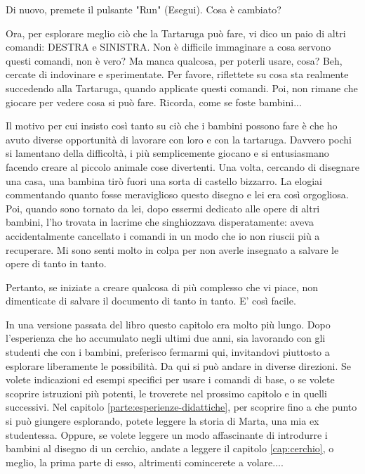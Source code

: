 \vskip 1cm

Di nuovo, premete il pulsante "Run" (Esegui). Cosa è cambiato? 

Ora, per esplorare meglio ciò che la Tartaruga può fare, vi dico un paio di altri comandi: DESTRA e SINISTRA. Non è difficile immaginare a cosa servono questi comandi, non è vero? Ma manca qualcosa, per poterli usare, cosa? Beh, cercate di indovinare e sperimentate. Per favore, riflettete su cosa sta realmente succedendo alla Tartaruga, quando applicate questi comandi. Poi, non rimane che giocare per vedere cosa si può fare. Ricorda, come se foste bambini...

Il motivo per cui insisto così tanto su ciò che i bambini possono fare è che ho avuto diverse opportunità di lavorare con loro e con la tartaruga. Davvero pochi si lamentano della difficoltà, i più semplicemente giocano e si entusiasmano facendo creare al piccolo animale cose divertenti.  Una volta, cercando di disegnare una casa, una bambina tirò fuori una sorta di castello bizzarro. La elogiai commentando quanto fosse meraviglioso questo disegno e lei era così orgogliosa. Poi, quando sono tornato da lei, dopo essermi dedicato alle opere di altri bambini, l'ho trovata in lacrime che singhiozzava disperatamente: aveva accidentalmente cancellato i comandi in un modo che io non riuscii più a recuperare. Mi sono senti molto in colpa per non averle insegnato a salvare le opere di tanto in tanto.

Pertanto, se iniziate a creare qualcosa di più complesso che vi piace, non dimenticate di salvare il documento di tanto in tanto. E' così facile.

In una versione passata del libro questo capitolo era molto più lungo. Dopo l'esperienza che ho accumulato negli ultimi due anni, sia lavorando con gli studenti che con i bambini, preferisco fermarmi qui, invitandovi piuttosto a esplorare liberamente le possibilità. Da qui si può andare in diverse direzioni. Se volete indicazioni ed esempi specifici per usare i comandi di base, o se volete scoprire istruzioni più potenti, le troverete nel prossimo capitolo e in quelli successivi.  Nel capitolo \ref{parte:esperienze-didattiche}, per scoprire fino a che punto si può giungere esplorando, potete leggere la storia di Marta, una mia ex studentessa. Oppure, se volete leggere un modo affascinante di introdurre i bambini al disegno di un cerchio, andate a leggere il capitolo \ref{cap:cerchio}, o meglio, la prima parte di esso, altrimenti comincerete a volare....
 

